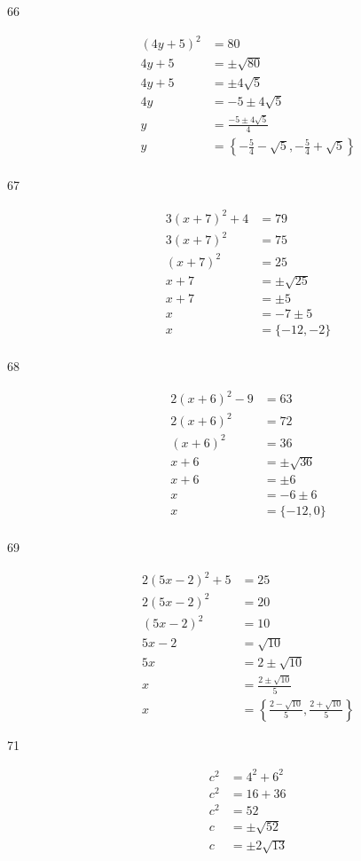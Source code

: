 \documentclass[fleqn,addpoints]{exam}
\begin{document}
\begin{description}
\item[66]
\begin{align*}
  (4y+5)^2 &= 80 \\
  4y+5 &= \pm \sqrt{80} \\
  4y+5 &= \pm 4 \sqrt{5} \\
  4y &= -5 \pm 4 \sqrt{5} \\  
  y &= \frac{-5 \pm 4\sqrt{5}}{4} \\  
  y &= \left \{ - \frac{5}{4} - \sqrt{5}, -\frac{5}{4} + \sqrt{5} \right \} \\  
\end{align*}

\item[67]
\begin{align*}
  3(x+7)^2 + 4 &= 79 \\
  3(x+7)^2 &= 75 \\
  (x+7)^2 &= 25 \\
  x+7 &= \pm \sqrt{25} \\
  x+7 &= \pm 5 \\
  x &= -7 \pm 5 \\
  x &= \{ -12, -2 \} \\
\end{align*}

\item[68]
\begin{align*}
  2(x+6)^2 - 9 &= 63 \\
  2(x+6)^2 &= 72 \\
  (x+6)^2 &= 36 \\
  x+6 &= \pm \sqrt{36} \\
  x+6 &= \pm 6 \\
  x &= -6 \pm 6 \\
  x &= \{ -12, 0 \} \\
\end{align*}

\item[69]
\begin{align*}
  2(5x-2)^2 + 5 &= 25 \\
  2(5x-2)^2  &= 20 \\
  (5x-2)^2  &= 10 \\
  5x-2  &= \sqrt{10} \\
  5x  &= 2 \pm \sqrt{10} \\
  x  &= \frac{2 \pm \sqrt{10}}{5} \\
  x &= \left \{ \frac{2 - \sqrt{10}}{5}, \frac{2 + \sqrt{10}}{5} \right \}
\end{align*}

\item[71]
\begin{align*}
  c^2 &= 4^2 + 6^2 \\
  c^2 &= 16 + 36 \\
  c^2 &= 52 \\
  c   &= \pm \sqrt{52} \\
  c   &= \pm 2\sqrt{13} \\
\end{align*}


\end{description}
\end{document}

